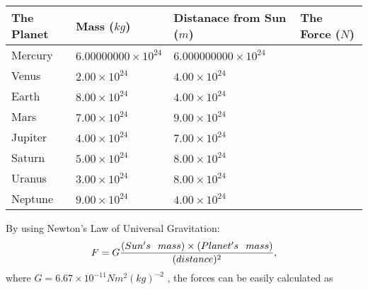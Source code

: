 \documentclass[12pt]{article}
\begin{document}
 
\begin{tabular}{|l|l|l|l|}
\hline
The Planet & Mass ($kg$) & Distanace from Sun ($m$) & The Force ($N$)\\
\hline
Mercury  &
           $ %
6.00000000 \times 10^{24} $   &
             $ %
6.000000000 \times 10^{24} $    &
\\  \hline
Venus    &
           $ %
2.00 \times 10^{24} $    &
             $ %
4.00 \times 10^{24} $    &
\\  \hline
Earth    &
           $ %
8.00 \times 10^{24} $    &
             $ %
4.00 \times 10^{24} $    &
\\   \hline
Mars     &
           $ %
7.00 \times 10^{24} $    &
             $ %
9.00 \times 10^{24} $    &
\\   \hline
Jupiter  &
           $ %
4.00 \times 10^{24} $    &
             $ %
7.00 \times 10^{24} $    &
\\  \hline
Saturn   &
           $ %
5.00 \times 10^{24}$    &
             $ %
8.00 \times 10^{24}$    &
\\  \hline
Uranus   &
           $ %
3.00 \times 10^{24} $    &
             $ %
8.00 \times 10^{24} $    &
\\  \hline
Neptune  &
           $ %
9.00 \times 10^{24} $    &
             $ %
4.00 \times 10^{24} $    &
\\  \hline
 
\end{tabular}
 
 
 
 
\noindent{}
 
 

By using Newton's Law of Universal Gravitation:
\[
F=G \frac{(Sun's \hspace{0.1in} mass) \times (Planet's \hspace{0.1in} mass)} { (distance)^2},
\]
where
$ G= %
6.67 \times 10^{-11}N m^{2}(kg)^{-2}$ , the forces can be easily calculated as
 
\vspace{0.2in}
 
\end{document}

